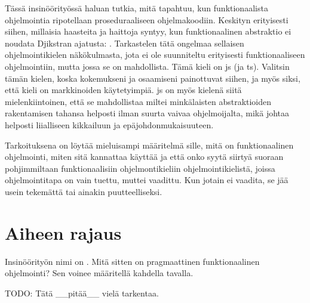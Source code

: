 Tässä insinöörityössä haluan tutkia, mitä tapahtuu, kun funktionaalista ohjelmointia ripotellaan proseduraaliseen ohjelmakoodiin. Keskityn erityisesti siihen, millaisia haasteita ja haittoja syntyy, kun funktionaalinen abstraktio ei noudata Djikstran ajatusta:  \cite{dijkstra_humble_programmer}. Tarkastelen tätä ongelmaa sellaisen ohjelmointikielen näkökulmasta, jota ei ole suunniteltu erityisesti funktionaaliseen ohjelmointiin, mutta jossa se on mahdollista. Tämä kieli on \gls{js} (ja \gls{ts}). Valitsin tämän kielen, koska kokemukseni ja osaamiseni painottuvat siihen, ja myös siksi, että kieli on markkinoiden käytetyimpiä. \Gls{js} on myös kielenä siitä mielenkiintoinen, että se mahdollistaa miltei minkälaisten abstraktioiden rakentamisen tahansa helposti ilman suurta vaivaa ohjelmoijalta, mikä johtaa helposti liialliseen kikkailuun ja epäjohdonmukaisuuteen.

Tarkoituksena on löytää mieluisampi määritelmä sille, mitä on funktionaalinen ohjelmointi, miten sitä kannattaa käyttää ja että onko syytä siirtyä suoraan pohjimmiltaan funktionaalisiin ohjelmontikieliin ohjelmointikielistä, joissa ohjelmointitapa on vain tuettu, muttei vaadittu. Kun jotain ei vaadita, se jää usein tekemättä tai ainakin puutteelliseksi.

\section{Aiheen rajaus}

Insinöörityön nimi on \textquote{\otsikko}. Mitä sitten on pragmaattinen funktionaalinen ohjelmointi? Sen voinee määritellä kahdella tavalla.

TODO: Tätä __pitää__ vielä tarkentaa.